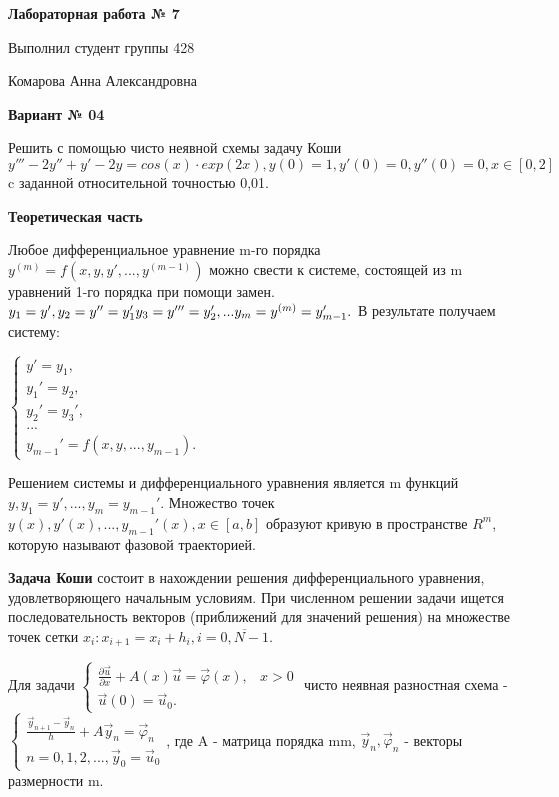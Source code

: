 \documentclass{article}
\begin{document}
\huge
\textbf{Лабораторная работа № 7}
\Large

Выполнил студент группы 428

Комарова Анна Александровна

\LARGE
\textbf{Вариант № 04}

\Large
Решить с помощью чисто неявной схемы задачу Коши \( y'''-2y''+y'-2y=cos(x)\cdot exp(2x),  y(0)=1,{y}'(0)=0,{y}''(0)=0,x\in [0,2]\)
c заданной относительной точностью 0,01.

\LARGE
\textbf{Теоретическая часть}

\Large
Любое дифференциальное уравнение  m-го порядка \(y^{(m)}=f(x,y,y',...,y^{(m-1)})\) можно свести к системе, состоящей из m уравнений 1-го порядка при помощи замен. 
\(\\y_{1}=y',\\
y_{2}=y''=y_{1}'\\
y_{3}=y'''=y_{2}',\\
...\\
y_{m}=y^{(m)}=y_{m-1}'.\\
\)
В результате получаем систему:

\(\begin{cases}
 y'=y_{1}, \\ 
 y_{1}'=y_{2},\\ 
 y_{2}'=y_{3}', \\ 
 ... \\ 
 y_{m-1}'=f(x,y,...,y_{m-1}). 
\end{cases} \)

Решением системы и дифференциального уравнения является m функций 
\(y, y_{1}=y',...,y_{m}=y_{m-1}'\). Множество точек \(y(x),y'(x),...,y_{m-1}'(x),x\in [a,b]\) образуют кривую в пространстве \(R^m\), которую называют фазовой траекторией.

\textbf{Задача Коши} состоит в нахождении решения дифференциального уравнения, удовлетворяющего начальным условиям. При численном решении задачи ищется последовательность векторов (приближений для значений решения) на множестве точек сетки \(x_{i}:x_{i+1}=x_{i}+h_{i}, i=\overline{0,N-1}. \)

Для задачи 
\( \begin{cases}
 \frac{\partial \vec{u}}{\partial x}+A(x)\vec{u}=\vec{\varphi} (x),& x>0 \\ 
 \vec{u}(0)=\vec{u}_{0}. 
\end{cases} \) чисто неявная разностная схема - 
\(\begin{cases}
 \frac{\vec{y}_{n+1}-\vec{y}_{n}}{h}+A\vec{y}_{n}=\vec{\varphi}_{n}\\ 
n=0,1,2,..., \vec{y}_{0}=\vec{u}_{0} 
\end{cases} \), где A - матрица порядка m\times m, \(\vec{y}_{n},\vec{\varphi}_{n}\) - векторы размерности m.
\end{document}
